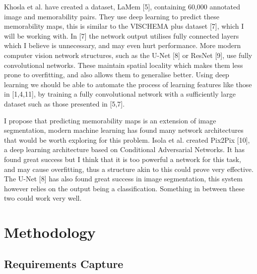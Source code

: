 \documentclass{UoYCSproject}
\begin{document}
Khosla et al. have created a dataset, LaMem [5], containing 60,000 annotated image and memorability pairs. They use deep learning to predict these memorability maps, this is similar to the VISCHEMA plus dataset [7], which I will be working with. In [7] the network output utilises fully connected layers which I believe is unnecessary, and may even hurt performance. More modern computer vision network structures, such as the U-Net [8] or ResNet [9], use fully convolutional networks. These maintain spatial locality which makes them less prone to overfitting, and also allows them to generalise better. Using deep learning we should be able to automate the process of learning features like those in [1,4,11], by training a fully convolutional network with a sufficiently large dataset such as those presented in [5,7].

I propose that predicting memorability maps is an extension of image segmentation, modern machine learning has found many network architectures that would be worth exploring for this problem. Isola et al. created Pix2Pix [10], a deep learning architecture based on Conditional Adversarial Networks. It has found great success but I think that it is too powerful a network for this task, and may cause overfitting, thus a structure akin to this could prove very effective. The U-Net [8] has also found great success in image segmentation, this system however relies on the output being a classification. Something in between these two could work very well.

\newpage{}

\section{Methodology}




\subsection{Requirements Capture}
\end{document}
